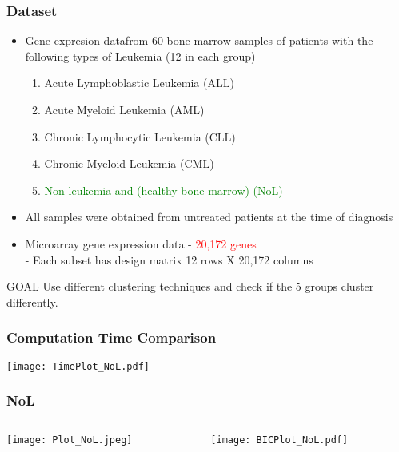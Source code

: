 \documentclass[10pt,dvipsnames,table]{beamer}
\begin{document}
\begin{frame}
\frametitle{Dataset}
\begin{itemize}
\item Gene expresion data\footnotemark from 60 bone marrow samples of patients with the following types of Leukemia (12 in each group)
\begin{enumerate}
\item Acute Lymphoblastic Leukemia (ALL)
\item Acute Myeloid Leukemia (AML)
\item Chronic Lymphocytic Leukemia (CLL)
\item Chronic Myeloid Leukemia (CML)
\item \textcolor{green}{Non-leukemia and (healthy bone marrow) (NoL)}
\end{enumerate}
\pause \item All samples were obtained from untreated patients at the time of diagnosis
\pause \item Microarray gene expression data - \textcolor{red}{20,172 genes} \\
\hspace{0.5cm} - Each subset has design matrix 12 rows X 20,172 columns
\end{itemize}
\pause 
\begin{block}{GOAL} 
Use different clustering techniques and check if the 5 groups cluster differently.
\end{block}
\end{frame}

\begin{frame}
\frametitle{Computation Time Comparison}
\begin{center}
\texttt{[image: TimePlot\_NoL.pdf]}
\end{center}
\end{frame}

\begin{frame}
\frametitle{NoL}
\begin{columns}
\begin{column}{5cm}
\texttt{[image: Plot\_NoL.jpeg]} \\
\end{column}
\begin{column}{5cm}
\pause \texttt{[image: BICPlot\_NoL.pdf]} \\
\end{column}
\end{columns}
\end{frame}
\end{document}
